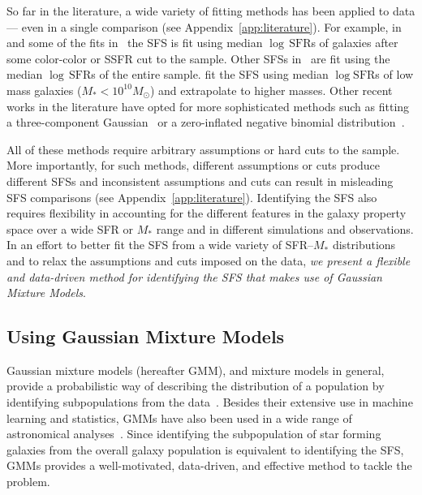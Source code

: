 \documentclass[tighten, preprint]{aastex62}
\begin{document}
So far in the literature, a wide variety of fitting methods has been applied to 
data --- even in a single comparison (see Appendix~\ref{app:literature}). 
{\color{red}
For example, in \cite{lee2015} and some of the fits in~\cite{somerville2015b}
the SFS is fit using median $\log\,\mathrm{SFR}$s of galaxies after some 
color-color or SSFR cut to the sample. Other SFSs in~\cite{somerville2015b} 
are fit using the median $\log\,\mathrm{SFR}$s of the entire sample. 
\cite{bluck2016} fit the SFS using median $\log\mathrm{SFR}$s of low mass 
galaxies ($M_* < 10^{10}M_\odot$) and extrapolate to higher 
masses.} %
Other recent works in the literature have opted for more sophisticated 
methods such as fitting a three-component Gaussian~\citep{bisigello2018} 
or a zero-inflated negative binomial distribution~\citep{feldmann2017}. 

{\color{red}
All of these methods require arbitrary assumptions or hard cuts to the 
sample. More importantly, for such methods, different assumptions 
or cuts produce different SFSs and inconsistent assumptions and cuts 
can result in misleading SFS comparisons (see Appendix~\ref{app:literature}).}
Identifying the SFS also requires flexibility in accounting 
for the different features in the galaxy property space over a wide SFR or 
$M_*$ range and in different simulations and observations.
In an effort to better fit the SFS from a wide variety of SFR--$M_*$ 
distributions and to relax the assumptions and cuts imposed on the data, 
\emph{we present a flexible and data-driven method for identifying the SFS 
that makes use of Gaussian Mixture Models}.

\subsection{Using Gaussian Mixture Models}
Gaussian mixture models (hereafter GMM), and mixture models in general, provide 
a probabilistic way of describing the distribution of a population by 
identifying subpopulations from the data~\citep[][]{Press:1992:NRC:148286, 9780471006268}.
Besides their extensive use in machine learning and statistics, 
GMMs have also been used in a wide range of astronomical analyses~\citep[\emph{e.g.}][]{bovy2011,lee2012,taylor2015}. 
Since identifying the subpopulation of star forming galaxies from the overall
galaxy population is equivalent to {\color{red} identifying} the SFS, GMMs provides a 
well-motivated, data-driven, and effective method to tackle the problem. 
\end{document}
